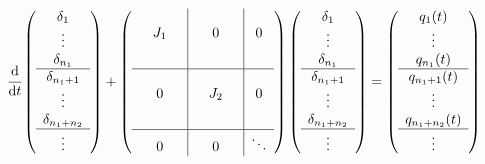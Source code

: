     \begin{equation}
        \cfrac{\mathrm{d} }{\mathrm{d} t} 
        \left(\begin{array}{c}
            \delta_{1} \\ \vdots \\ \delta_{n_1} \\ 
            \hline
            \delta_{n_1 + 1} \\ \vdots \\ \delta_{n_1 + n_2} \\ 
            \hline
            \vdots 
        \end{array}\right)
        +
        \left(\begin{array}{c|c|c}
            \begin{matrix} && \\ &J_1& \\ && \end{matrix} & 0 & 0 \\[1.9em]
            \hline
            0 & \begin{matrix} && \\ &J_2& \\ && \end{matrix} & 0 \\[1.9em]
            \hline
            0 & 0 & \ddots 
        \end{array}\right)
        \left(\begin{array}{c}
            \delta_{1} \\ \vdots \\ \delta_{n_1} \\ 
            \hline
            \delta_{n_1 + 1} \\ \vdots \\ \delta_{n_1 + n_2} \\ 
            \hline
            \vdots 
        \end{array}\right)
        =
        \left(\begin{array}{c}
            q_{1}(t)\\\vdots\\ q_{n_1}(t) \\ 
            \hline
            q_{n_1 + 1}(t) \\ \vdots \\ q_{n_1 + n_2}(t) \\ 
            \hline
            \vdots 
        \end{array}\right)
    \end{equation}
\endgroup

